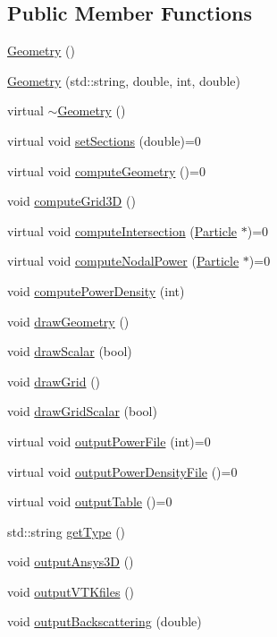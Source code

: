 \subsection*{Public Member Functions}
\begin{DoxyCompactItemize}
\item 
\hyperlink{classGeometry_a4c301c163c63d21ed08c17b0f4e131d3}{Geometry} ()
\item 
\hyperlink{classGeometry_a41098c2bf13aa50be3fb767a8adf1372}{Geometry} (std\-::string, double, int, double)
\item 
virtual \hyperlink{classGeometry_ad55e832122ab3a2833dcaa6507867678}{$\sim$\-Geometry} ()
\item 
virtual void \hyperlink{classGeometry_aab2d4db916d7c8541af6624a82b2d4df}{set\-Sections} (double)=0
\item 
virtual void \hyperlink{classGeometry_a3e77ac889d1e440c24efbde630aa1933}{compute\-Geometry} ()=0
\item 
void \hyperlink{classGeometry_ad8ae3b4a3563c1592ffcb06f135ed535}{compute\-Grid3\-D} ()
\item 
virtual void \hyperlink{classGeometry_ac2e6c74ef25ff3e0c4f46b2c80484881}{compute\-Intersection} (\hyperlink{classParticle}{Particle} $\ast$)=0
\item 
virtual void \hyperlink{classGeometry_af60650f8ce6d5a220928ccd7395120df}{compute\-Nodal\-Power} (\hyperlink{classParticle}{Particle} $\ast$)=0
\item 
void \hyperlink{classGeometry_adc19b7de33b16179c874dc536f58c31b}{compute\-Power\-Density} (int)
\item 
void \hyperlink{classGeometry_a4f2e62b82b91402b4f9c8fbf26048974}{draw\-Geometry} ()
\item 
void \hyperlink{classGeometry_aa87a5cf1d8652d217834df05ed8cc1e4}{draw\-Scalar} (bool)
\item 
void \hyperlink{classGeometry_afcf8201c8ef7f3999f70af53a8034a49}{draw\-Grid} ()
\item 
void \hyperlink{classGeometry_a95d761cd11aa2261380e10b66c261670}{draw\-Grid\-Scalar} (bool)
\item 
virtual void \hyperlink{classGeometry_a37f5f2788753e4b8dfcf8de787476d56}{output\-Power\-File} (int)=0
\item 
virtual void \hyperlink{classGeometry_ad5ea8315df4569915beed2cfbe01fac9}{output\-Power\-Density\-File} ()=0
\item 
virtual void \hyperlink{classGeometry_a60e1424a222ba59284b81812aff34148}{output\-Table} ()=0
\item 
std\-::string \hyperlink{classGeometry_a565f5b7736c4b0894732900199903d54}{get\-Type} ()
\item 
void \hyperlink{classGeometry_a1324967baeb20a489a913a5bd854aa79}{output\-Ansys3\-D} ()
\item 
void \hyperlink{classGeometry_a966a7feaea5c6fe2814229f0c54786db}{output\-V\-T\-Kfiles} ()
\item 
void \hyperlink{classGeometry_aeeebae1f3110d179f2be42d5ebcfea67}{output\-Backscattering} (double)
\end{DoxyCompactItemize}
